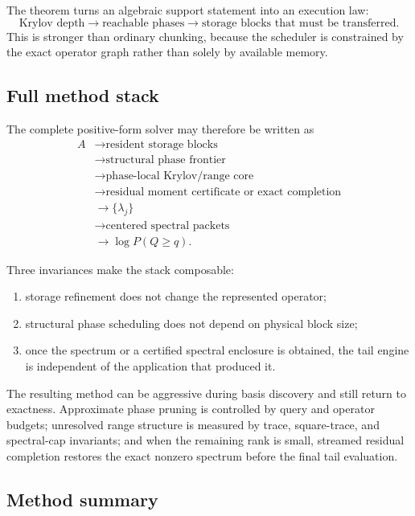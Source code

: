 \documentclass[11pt]{article}
\theoremstyle{definition}
\theoremstyle{remark}
\begin{document}
The theorem turns an algebraic support statement into an execution law:
\[
\boxed{
\text{Krylov depth}
\longrightarrow
\text{reachable phases}
\longrightarrow
\text{storage blocks that must be transferred}.
}
\]
This is stronger than ordinary chunking, because the scheduler is constrained
by the exact operator graph rather than solely by available memory.

\subsection{Full method stack}

The complete positive-form solver may therefore be written as
\[
\boxed{\begin{aligned}
A
&\longrightarrow \text{resident storage blocks}\\
&\longrightarrow \text{structural phase frontier}\\
&\longrightarrow \text{phase-local Krylov/range core}\\
&\longrightarrow \text{residual moment certificate or exact completion}\\
&\longrightarrow \{\lambda_j\}\\
&\longrightarrow \text{centered spectral packets}\\
&\longrightarrow \log P(Q\ge q).
\end{aligned}}
\]

Three invariances make the stack composable:
\begin{enumerate}
\item storage refinement does not change the represented operator;
\item structural phase scheduling does not depend on physical block size;
\item once the spectrum or a certified spectral enclosure is obtained, the
      tail engine is independent of the application that produced it.
\end{enumerate}

The resulting method can be aggressive during basis discovery and still return
to exactness.  Approximate phase pruning is controlled by query and operator
budgets; unresolved range structure is measured by trace, square-trace, and
spectral-cap invariants; and when the remaining rank is small, streamed
residual completion restores the exact nonzero spectrum before the final tail
evaluation.

\subsection{Method summary}
\end{document}
